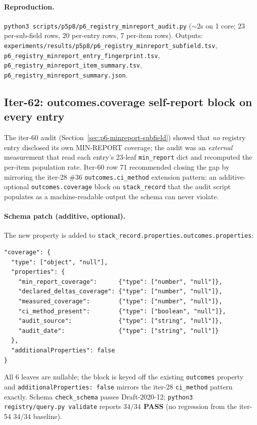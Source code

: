 \documentclass{article}
\providecommand{\secref}[1]{Section~\ref{#1}}
\begin{document}
\paragraph{Reproduction.}
\texttt{python3 scripts/p5p8/p6\_registry\_minreport\_audit.py}
($\sim$2s on 1 core; $23$ per-sub-field rows, $20$ per-entry rows,
$7$ per-item rows). Outputs:
\texttt{experiments/results/p5p8/p6\_registry\_minreport\_subfield.tsv},
\texttt{p6\_registry\_minreport\_entry\_fingerprint.tsv},
\texttt{p6\_registry\_minreport\_item\_summary.tsv},
\texttt{p6\_registry\_minreport\_summary.json}.

\subsection{Iter-62: outcomes.coverage self-report block on every entry}
\label{sec:p6-outcomes-coverage-block}

The iter-60 audit (\secref{sec:p6-minreport-subfield}) showed that
\emph{no} registry entry disclosed its own MIN-REPORT coverage; the
audit was an \emph{external} measurement that read each entry's
$23$-leaf \texttt{min\_report} dict and recomputed the per-item
population rate. Iter-60 row 71 recommended closing the gap by
mirroring the iter-28 \#36 \texttt{outcomes.ci\_method} extension
pattern: an additive-optional \texttt{outcomes.coverage} block on
\texttt{stack\_record} that the audit script populates as a
machine-readable output the schema can never violate.

\paragraph{Schema patch (additive, optional).}
The new property is added to \texttt{stack\_record.properties.outcomes.properties}:
\begin{verbatim}
"coverage": {
  "type": ["object", "null"],
  "properties": {
    "min_report_coverage":      {"type": ["number", "null"]},
    "declared_deltas_coverage": {"type": ["number", "null"]},
    "measured_coverage":        {"type": ["number", "null"]},
    "ci_method_present":        {"type": ["boolean", "null"]},
    "audit_source":             {"type": ["string", "null"]},
    "audit_date":               {"type": ["string", "null"]}
  },
  "additionalProperties": false
}
\end{verbatim}
All $6$ leaves are nullable; the block is keyed off the existing
\texttt{outcomes} property and \texttt{additionalProperties: false}
mirrors the iter-28 \texttt{ci\_method} pattern exactly. Schema
\texttt{check\_schema} passes Draft-2020-12; \texttt{python3
registry/query.py validate} reports \textbf{$34/34$ PASS} (no
regression from the iter-54 $34/34$ baseline).
\end{document}
